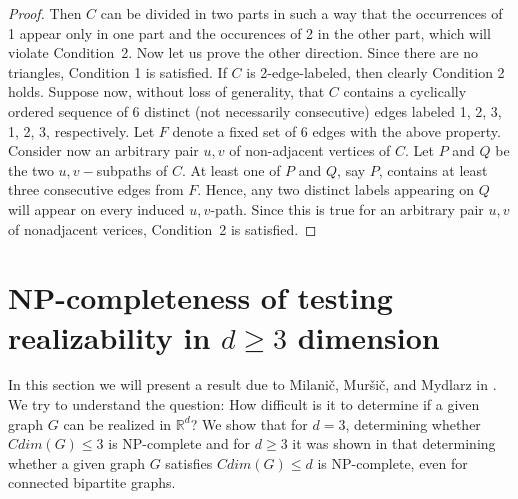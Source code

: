 \documentclass[12pt,a4paper,titlepage,openany]{report}
\begin{document}
\begin{proof}
Then $C$ can be divided in two parts in such a way that the occurrences of 1 appear only in one part and the occurences of 2 in the other part, which will violate Condition~2.\newline
Now let us prove the other direction. Since there are no triangles, Condition 1 is satisfied. \newline
If $C$ is 2-edge-labeled, then clearly Condition 2 holds.\newline
Suppose now, without loss of generality, that $C$ contains a cyclically ordered sequence of 6 distinct (not necessarily consecutive) edges labeled 1, 2, 3, 1, 2, 3, respectively. Let $F$ denote a fixed set of 6 edges with the above property. Consider now an arbitrary pair $u,v$ of non-adjacent vertices of $C$. Let $P$ and $Q$ be the two $u,v-$subpaths of $C$. At least one of $P$ and $Q$, say $P$, contains at least three consecutive edges from $F$. Hence, any two distinct labels appearing on $Q$ will appear on every induced $u,v$-path. Since this is true for an arbitrary pair $u,v$ of nonadjacent verices, Condition~2 is satisfied.\qedhere


\end{proof}

\section{NP-completeness of testing realizability in $d\geq 3$ dimension}
In this section we will present a result due to Milani\v c, Mur\v si\v c, and Mydlarz in \cite{Milanic}.\newline
We try to understand the question: How difficult is it to determine if a given graph $G$ can be realized in $\mathbb{R}^d$?\newline
We show that for $d=3$, determining whether $Cdim(G)\leq 3$ is NP-complete and for $d\geq 3$ it was shown in \cite{Milanic} that determining whether a given graph $G$ satisfies $Cdim(G) \leq d$ is NP-complete, even for connected bipartite graphs.
\end{document}
